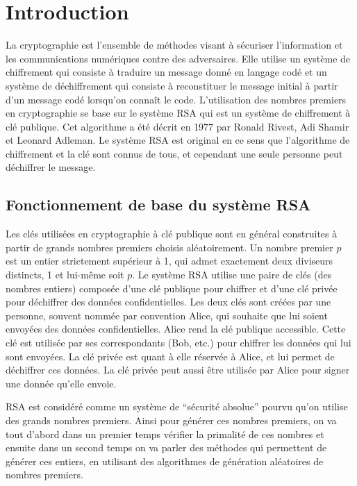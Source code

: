 
\chapter{Introduction}

La cryptographie est l’ensemble de méthodes visant à sécuriser l’information et les communications numériques contre des adversaires. Elle utilise un système de chiffrement qui consiste à traduire un message donné en langage codé et un système de déchiffrement qui consiste à reconstituer le message initial à partir d'un message codé lorsqu'on connaît le code. 
L’utilisation des nombres premiers en cryptographie se base sur le système RSA qui est un système de chiffrement à clé publique. Cet algorithme a été décrit en 1977 par Ronald Rivest, Adi Shamir et Leonard Adleman. Le système RSA est original en ce sens que l'algorithme de chiffrement et la clé sont connus de tous, et cependant une seule personne peut déchiffrer le message.

\section{Fonctionnement de base du système RSA}

Les clés utilisées en cryptographie à clé publique sont en général construites à partir de grands nombres premiers choisis aléatoirement.
Un nombre premier $p$ est un entier strictement supérieur à 1, qui admet exactement deux diviseurs distincts, 1 et lui-même soit $p$.
Le système RSA utilise une paire de clés (des nombres entiers) composée d'une clé publique pour chiffrer et d'une clé privée pour déchiffrer des données confidentielles. Les deux clés sont créées par une personne, souvent nommée par convention Alice, qui souhaite que lui soient envoyées des données confidentielles. Alice rend la clé publique accessible. Cette clé est utilisée par ses correspondants (Bob, etc.) pour chiffrer les données qui lui sont envoyées. La clé privée est quant à elle réservée à Alice, et lui permet de déchiffrer ces données. La clé privée peut aussi être utilisée par Alice pour signer une donnée qu'elle envoie.

RSA est considéré comme un système de “sécurité absolue” pourvu qu’on utilise des grands nombres premiers.
Ainsi pour générer ces nombres premiers, on va tout d’abord dans un premier temps vérifier la primalité de ces nombres et ensuite dans un second temps on va parler des méthodes qui permettent de générer ces entiers, en utilisant des algorithmes de génération aléatoires de nombres premiers.

